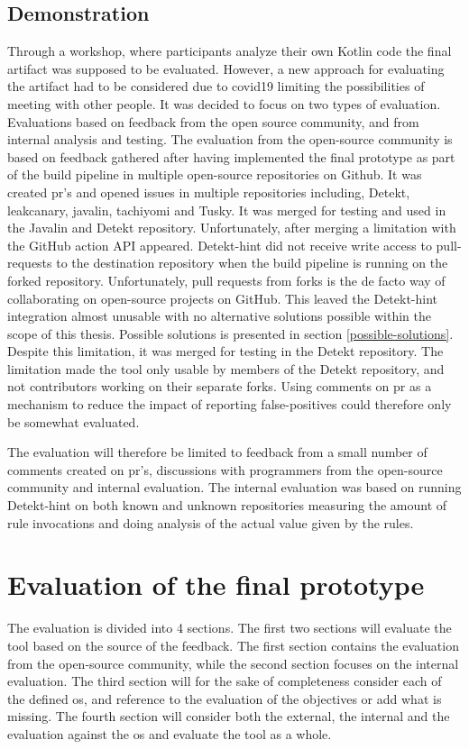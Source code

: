 \documentclass{report}
\begin{document}
\subsection*{Demonstration}

Through a workshop, where participants analyze their own Kotlin code the final artifact was supposed to be evaluated. However, a new approach for evaluating the artifact had to be considered due to \gls{covid19} limiting the possibilities of meeting with other people. It was decided to focus on two types of evaluation. Evaluations based on feedback from the open source community, and from internal analysis and testing. The evaluation from the open-source community is based on feedback gathered after having implemented the final prototype as part of the build pipeline in multiple open-source repositories on Github. It was created \gls{pr}'s and opened issues in multiple repositories including, Detekt\cite{detekt}, leakcanary\cite{leakcanary}, javalin\cite{javalin}, tachiyomi\cite{tachiyomi} and Tusky\cite{tusky}. It was merged for testing and used in the Javalin and Detekt repository. Unfortunately, after merging a limitation with the GitHub action API appeared. Detekt-hint did not receive write access to pull-requests to the destination repository when the build pipeline is running on the forked repository. Unfortunately, pull requests from forks is the de facto way of collaborating on open-source projects on GitHub. This leaved the Detekt-hint integration almost unusable with no alternative solutions possible within the scope of this thesis. Possible solutions is presented in section \ref{possible-solutions}. Despite this limitation, it was merged for testing in the Detekt repository. The limitation made the tool only usable by members of the Detekt repository, and not contributors working on their separate forks. Using comments on \gls{pr} as a mechanism to reduce the impact of reporting false-positives could therefore only be somewhat evaluated.

The evaluation will therefore be limited to feedback from a small number of comments created on \gls{pr}'s, discussions with programmers from the open-source community and internal evaluation. The internal evaluation was based on running Detekt-hint on both known and unknown repositories measuring the amount of rule invocations and doing analysis of the actual value given by the rules. 

\section{Evaluation of the final prototype}
\label{evaluation-final-prototype}
The evaluation is divided into 4 sections. The first two sections will evaluate the tool based on the source of the feedback. The first section contains the evaluation from the open-source community, while the second section focuses on the internal evaluation. The third section will for the sake of completeness consider each of the defined \gls{os}, and reference to the evaluation of the objectives or add what is missing.  The fourth section will consider both the external, the internal and the evaluation against the \gls{os} and evaluate the tool as a whole. 
\end{document}
